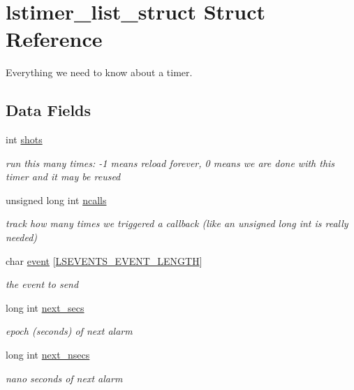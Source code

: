 \hypertarget{structlstimer__list__struct}{\section{lstimer\-\_\-list\-\_\-struct Struct Reference}
\label{structlstimer__list__struct}
}


Everything we need to know about a timer.  


\subsection*{Data Fields}
\begin{DoxyCompactItemize}
\item 
int \hyperlink{structlstimer__list__struct_ac7ab4cd1f3065156f95b49e66bf05283}{shots}
\begin{DoxyCompactList}\small\item\em run this many times\-: -\/1 means reload forever, 0 means we are done with this timer and it may be reused \end{DoxyCompactList}\item 
unsigned long int \hyperlink{structlstimer__list__struct_aa56c5b8ce7fa0ae93132cb9908195836}{ncalls}
\begin{DoxyCompactList}\small\item\em track how many times we triggered a callback (like an unsigned long int is really needed) \end{DoxyCompactList}\item 
char \hyperlink{structlstimer__list__struct_a54d564e392315b2730278bb925803184}{event} \mbox{[}\hyperlink{pgpmac_8h_ab61d790b5572f116e091babfda53627b}{L\-S\-E\-V\-E\-N\-T\-S\-\_\-\-E\-V\-E\-N\-T\-\_\-\-L\-E\-N\-G\-T\-H}\mbox{]}
\begin{DoxyCompactList}\small\item\em the event to send \end{DoxyCompactList}\item 
long int \hyperlink{structlstimer__list__struct_a6a7538fafa77c5769c8dd2bdd34500b7}{next\-\_\-secs}
\begin{DoxyCompactList}\small\item\em epoch (seconds) of next alarm \end{DoxyCompactList}\item 
long int \hyperlink{structlstimer__list__struct_acf993c87ab0ee8ffd74c3907022d6996}{next\-\_\-nsecs}
\begin{DoxyCompactList}\small\item\em nano seconds of next alarm \end{DoxyCompactList}\item 

\end{DoxyCompactItemize}
